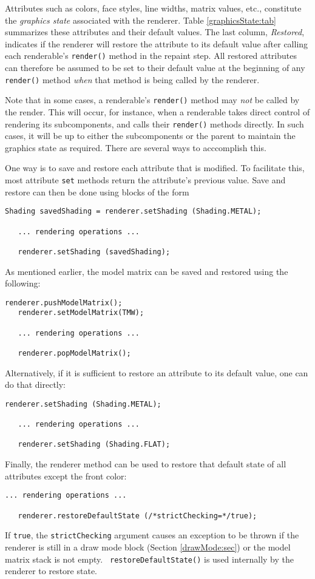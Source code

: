 Attributes such as colors, face styles, line widths, matrix values,
etc., constitute the {\it graphics state} associated with the
renderer.  Table \ref{graphicsState:tab} summarizes these attributes
and their default values. The last column, {\it Restored}, indicates
if the renderer will restore the attribute to its default value after
calling each renderable's {\tt render()} method in the repaint step.
All restored attributes can therefore be assumed to be set to their
default value at the beginning of any {\tt render()} method {\it when}
that method is being called by the renderer.

Note that in some cases, a renderable's {\tt render()} method may {\it
not} be called by the render. This will occur, for instance, when a
renderable takes direct control of rendering its subcomponents, and
calls their {\tt render()} methods directly. In such cases, it will be
up to either the subcomponents or the parent to maintain the graphics
state as required. There are several ways to acccomplish this.

One way is to save and restore each attribute that is modified.  To
facilitate this, most attribute {\tt set} methods return the
attribute's previous value.  Save and restore can then be done using
blocks of the form
%
\begin{lstlisting}[]
   Shading savedShading = renderer.setShading (Shading.METAL);

   ... rendering operations ...

   renderer.setShading (savedShading);
\end{lstlisting}
%
As mentioned earlier, the model matrix can be saved and restored
using the following:
%
\begin{lstlisting}[]
   renderer.pushModelMatrix();
   renderer.setModelMatrix(TMW);
   
   ... rendering operations ...

   renderer.popModelMatrix();
\end{lstlisting}
%
Alternatively, if it is sufficient to restore an attribute to its
default value, one can do that directly:
%
\begin{lstlisting}[]
   renderer.setShading (Shading.METAL);

   ... rendering operations ...

   renderer.setShading (Shading.FLAT);
\end{lstlisting}
%
Finally, the renderer method
 can be
used to restore that default state of all attributes except the
front color:
%
\begin{lstlisting}[]
   ... rendering operations ...
 
   renderer.restoreDefaultState (/*strictChecking=*/true);
\end{lstlisting}
%
If {\tt true}, the {\tt strictChecking} argument causes an exception
to be thrown if the renderer is still in a draw mode block (Section
\ref{drawMode:sec}) or the model matrix stack is not empty.  {\tt
restoreDefaultState()} is used internally by the renderer to restore
state.

